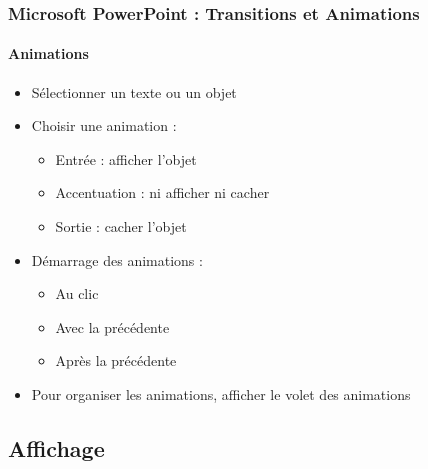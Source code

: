 \documentclass[xcolor=table, usenames,dvipsnames]{beamer}
\begin{document}
\begin{frame}[t]
\frametitle{Microsoft PowerPoint : Transitions et Animations}
\framesubtitle{Animations}


\begin{minipage}{0.58\textwidth}
	\begin{itemize}
		\item Sélectionner un texte ou un objet
		\item Choisir une animation : 
		\begin{itemize}
			\item Entrée : afficher l'objet
			\item Accentuation : ni afficher ni cacher 
			\item Sortie : cacher l'objet
		\end{itemize}
		\item Démarrage des animations : 
		\begin{itemize}
			\item Au clic
			\item Avec la précédente
			\item Après la précédente 
		\end{itemize}
		\item Pour organiser les animations, afficher le volet des animations
	\end{itemize}
\end{minipage}
%
\begin{minipage}{0.20\textwidth}
\end{minipage}
\begin{minipage}{0.20\textwidth}
\end{minipage}

\end{frame}

\subsection{Affichage}
\end{document}
